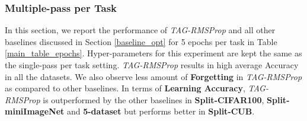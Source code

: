 \documentclass{article} \usepackage{collas2022_conference,times}
\begin{document}
    \subsubsection{Multiple-pass per Task}\label{multi_pass}
    In this section, we report the performance of \textit{TAG-RMSProp} and all other baselines discussed in Section \ref{baseline_opt} for 5 epochs per task in Table \ref{main_table_epochs}. Hyper-parameters for this experiment are kept the same as the single-pass per task setting. \textit{TAG-RMSProp} results in high average Accuracy in all the datasets. We also observe less amount of \textbf{Forgetting} in \textit{TAG-RMSProp} as compared to other baselines. In terms of \textbf{Learning Accuracy}, \textit{TAG-RMSProp} is outperformed by the other baselines in \textbf{Split-CIFAR100}, \textbf{Split-miniImageNet} and \textbf{5-dataset} but performs better in \textbf{Split-CUB}.
\end{document}
